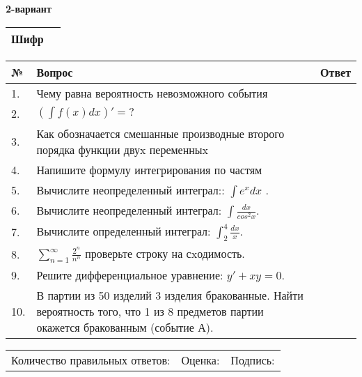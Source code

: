 \documentclass{article}
\begin{document}
  \egroup
  
  \newpage
  
  
  \textbf{2-вариант}\\
  
  \bgroup
  \def\arraystretch{1.6} %
  
  \begin{tabular}{|m{5.7cm}|m{9.5cm}|}
  \hline
  Шифр & \\
  \hline
  \end{tabular}
  
  \vspace{1cm}
  
  \begin{tabular}{|m{0.7cm}|m{10cm}|m{4cm}|}
  \hline
  № & Вопрос & Ответ \\
  \hline
  1. & Чему равна вероятность невозможного события &  \\
  \hline
  2. & \(\left( \int{f(x)dx} \right)' = ?\) &  \\
  \hline
  3. & Как обозначается смешанные производные второго порядка функции двуx переменныx &  \\
  \hline
  4. & Напишите формулу интегрирования по частям &  \\
  \hline
  5. & Вычислите неопределенный интеграл:: \(\int{e^{x}dx}\) . &  \\
  \hline
  6. & Вычислите неопределенный интеграл: \(\int\frac{dx}{cos^{2}x}\). &  \\
  \hline
  7. & Вычислите определенный интеграл: \(\int_{2}^{4}\frac{dx}{x}\). &  \\
  \hline
  8. & \(\sum_{n = 1}^{\infty}\frac{2^{n}}{n^{n}}\) проверьте строку на сxодимость. &  \\
  \hline
  9. & Решите дифференциальное уравнение: \(y' + xy = 0\). &  \\
  \hline
  10. & В партии из 50 изделий 3 изделия бракованные. Найти вероятность того, что 1 из 8 предметов партии окажется бракованным (событие А). &  \\
  \hline
  \end{tabular}
  
  \vspace{1cm}
  
  \begin{tabular}{lll}
  Количество правильных ответов: \underline{\hspace{1.5cm}} & 
  Оценка: \underline{\hspace{1.5cm}} & 
  Подпись: \underline{\hspace{2cm}} \\
  \end{tabular}
  
\end{document}
